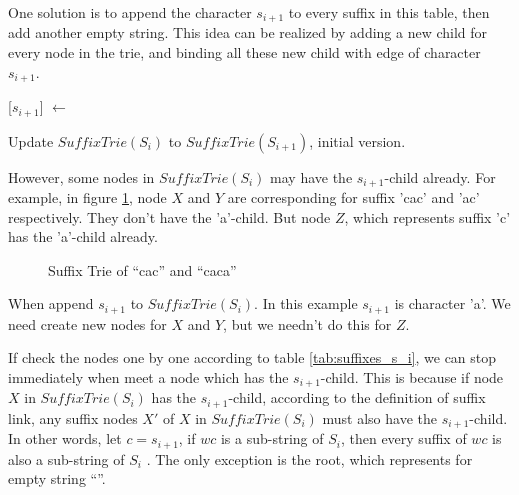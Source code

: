 \documentclass{article}
\begin{document}
One solution is to append the character $s_{i+1}$ to every suffix in this
table, then add another empty string. This idea can be realized by adding
a new child for every node in the trie, and binding all these new
child with edge of character $s_{i+1}$.

\begin{algorithm}
\begin{algorithmic}[1]
  \State {}[$s_{i+1}$] $\gets$ 
\EndFor
\end{algorithmic}
\caption{Update $SuffixTrie(S_i)$ to $SuffixTrie(S_{i+1})$, initial version.}
\label{algo:strie1}
\end{algorithm}

However, some nodes in $SuffixTrie(S_i)$ may have the $s_{i+1}$-child already.
For example, in figure \ref{fig:strie-cac}, node $X$ and $Y$ are corresponding
for suffix 'cac' and 'ac' respectively. They don't have the 'a'-child.
But node $Z$, which represents suffix 'c' has the 'a'-child already.

\begin{figure}[htbp]
  \centering
  \caption{Suffix Trie of ``cac'' and ``caca''}
  \label{fig:strie-cac}
\end{figure}

When append $s_{i+1}$ to $SuffixTrie(S_i)$. In this example $s_{i+1}$ is character 'a'.
We need create new nodes for $X$ and $Y$, but we needn't do this
for $Z$.

If check the nodes one by one according to table \ref{tab:suffixes_s_i}, we can
stop immediately when meet a node which has the $s_{i+1}$-child. This is because
if node $X$ in $SuffixTrie(S_i)$ has the $s_{i+1}$-child, according to the
definition of suffix link, any suffix nodes $X'$ of $X$ in $SuffixTrie(S_i)$ must
also have the $s_{i+1}$-child. In other words, let $c=s_{i+1}$, if $wc$ is a sub-string
of $S_i$, then every suffix of $wc$ is also a sub-string of $S_i$ \cite{ukkonen95}.
The only exception is the root, which represents for empty string ``''.
\end{document}
